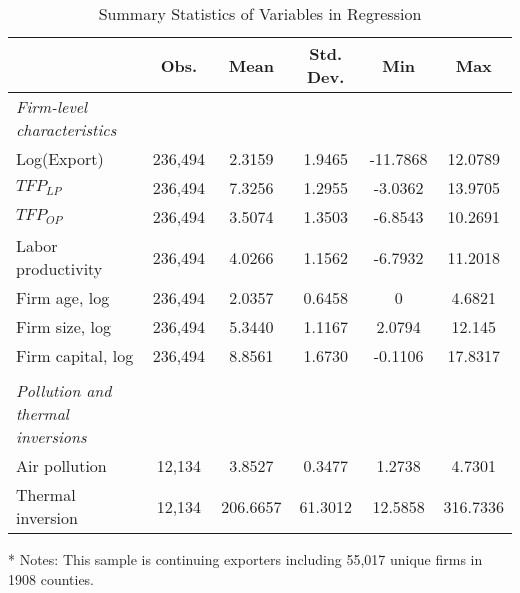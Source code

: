 \documentclass[12pt]{article}
\begin{document}
  \begin{table}[H]\centering
    \caption{Summary Statistics of Variables in Regression}\label{tab:stat}
    \begin{tabular}{l*{5}{c}}
      \hline\hline
    &\multicolumn{1}{c}{Obs.}&\multicolumn{1}{c}{Mean}&\multicolumn{1}{c}{Std. Dev.}&\multicolumn{1}{c}{Min}&\multicolumn{1}{c}{Max}\\             
      \hline
      \textit{Firm-level characteristics} &&&&&\\
      Log(Export)	&236,494	&2.3159	&1.9465&-11.7868&12.0789\\
      $TFP_{LP}$	&236,494	&7.3256	&1.2955&-3.0362&13.9705\\
      $TFP_{OP}$	&236,494	&3.5074	&1.3503&-6.8543&10.2691\\
      Labor productivity  &236,494	&4.0266	&1.1562&-6.7932&11.2018\\
      Firm age, log 	&236,494	&2.0357 &0.6458&0&4.6821\\
      Firm size, log	&236,494	&5.3440	&1.1167&2.0794&12.145\\
      Firm capital, log &236,494	&8.8561& 1.6730 &-0.1106&17.8317\\
                         &&&&&\\
      \textit{Pollution and thermal inversions} &&&&&\\    
      Air pollution      &12,134	& 3.8527	&0.3477&1.2738&4.7301\\
      Thermal inversion	&12,134 &206.6657	&61.3012&12.5858&316.7336\\
      \hline\hline
    \end{tabular}

    \begin{tablenotes}
      \item[*] \small Notes: This sample is continuing exporters including 55,017 unique firms in 1908 counties.
    \end{tablenotes}
  \end{table}
  
\end{document}
